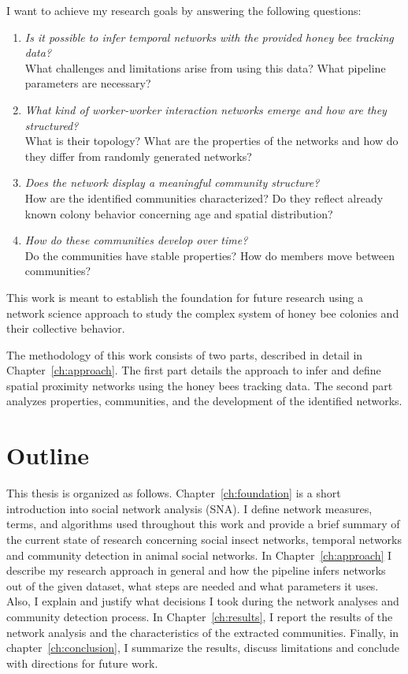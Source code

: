 I want to achieve my research goals by answering the following questions:

\begin{enumerate}
\item \emph{Is it possible to infer temporal networks with the provided honey bee tracking data?}\\
What challenges and limitations arise from using this data?
What pipeline parameters are necessary?
\item \emph{What kind of worker-worker interaction networks emerge and how are they structured?}\\
What is their topology?
What are the properties of the networks and how do they differ from randomly generated networks?
\item \emph{Does the network display a meaningful community structure?}\\
How are the identified communities characterized?
Do they reflect already known colony behavior concerning age and spatial distribution?
\item \emph{How do these communities develop over time?}\\
Do the communities have stable properties?
How do members move between communities?
\end{enumerate}


This work is meant to establish the foundation for future research using a network science approach to study the complex system of honey bee colonies and their collective behavior.

The methodology of this work consists of two parts, described in detail in Chapter~\ref{ch:approach}.
The first part details the approach to infer and define spatial proximity networks using the honey bees tracking data.
The second part analyzes properties, communities, and the development of the identified networks.  

\section{Outline}
This thesis is organized as follows.
Chapter~\ref{ch:foundation} is a short introduction into social network analysis (SNA). I define network measures, terms, and algorithms used throughout this work and provide a brief summary of the current state of research concerning social insect networks, temporal networks and community detection in animal social networks.
In Chapter~\ref{ch:approach} I describe my research approach in general and how the pipeline infers networks out of the given dataset, what steps are needed and what parameters it uses.
Also, I explain and justify what decisions I took during the network analyses and community detection process.
In Chapter~\ref{ch:results}, I report the results of the network analysis and the characteristics of the extracted communities.
Finally, in chapter~\ref{ch:conclusion}, I summarize the results, discuss limitations and conclude with directions for future work.